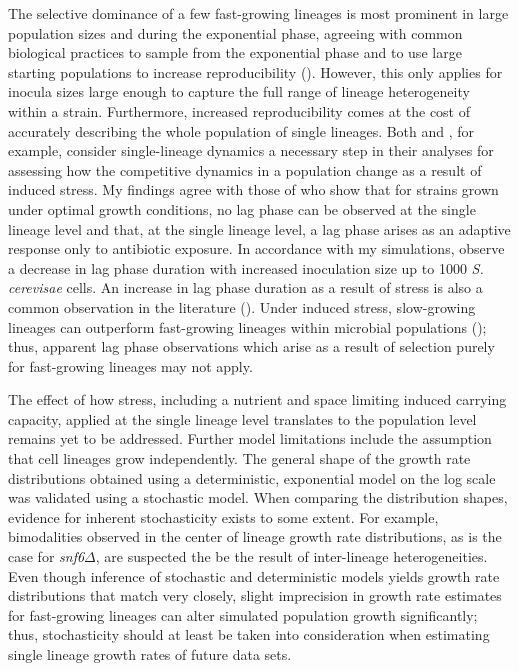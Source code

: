 \documentclass{bioinfo}
\begin{document}
{The selective dominance of a few fast-growing lineages is most prominent in large population sizes and during the exponential phase, agreeing with common biological practices to sample from the exponential phase and to use large starting populations to increase reproducibility (\citealp{Greenwood12,Jasmin12}). However, this only applies for inocula sizes large enough to capture the full range of lineage heterogeneity within a strain. Furthermore, increased reproducibility comes at the cost of accurately describing the whole population of single lineages. Both \cite{Dijk15} and \cite{Levy12}, for example, consider single-lineage dynamics a necessary step in their analyses for assessing how the competitive dynamics in a population change as a result of induced stress. My findings agree with those of \cite{Fridman14} who show that for strains grown under optimal growth conditions, no lag phase can be observed at the single lineage level and that, at the single lineage level, a lag phase arises as an adaptive response only to antibiotic exposure. In accordance with my simulations, \cite{Ginovart11} observe a decrease in lag phase duration with increased inoculation size up to 1000 \textit{S. cerevisae} cells. An increase in lag phase duration as a result of stress is also a common observation in the literature (\citealp{Augustin00,Robinson01}). Under induced stress, slow-growing lineages can outperform fast-growing lineages within microbial populations (\citealp{Levy12,Batchelor97}); thus, apparent lag phase observations which arise as a result of selection purely for fast-growing lineages may not apply.  

The effect of how stress, including a nutrient and space limiting induced carrying capacity, applied at the single lineage level translates to the population level remains yet to be addressed. Further model limitations include the assumption that cell lineages grow independently. The general shape of the growth rate distributions obtained using a deterministic, exponential model on the log scale was validated using a stochastic model. When comparing the distribution shapes, evidence for inherent stochasticity exists to some extent. For example, bimodalities observed in the center of lineage growth rate distributions, as is the case for \textit{snf6}$\Delta$, are suspected the be the result of inter-lineage heterogeneities. Even though inference of stochastic and deterministic models yields growth rate distributions that match very closely, slight imprecision in growth rate estimates for fast-growing lineages can alter simulated population growth significantly; thus, stochasticity should at least be taken into consideration when estimating single lineage growth rates of future data sets. 

}
\end{document}
